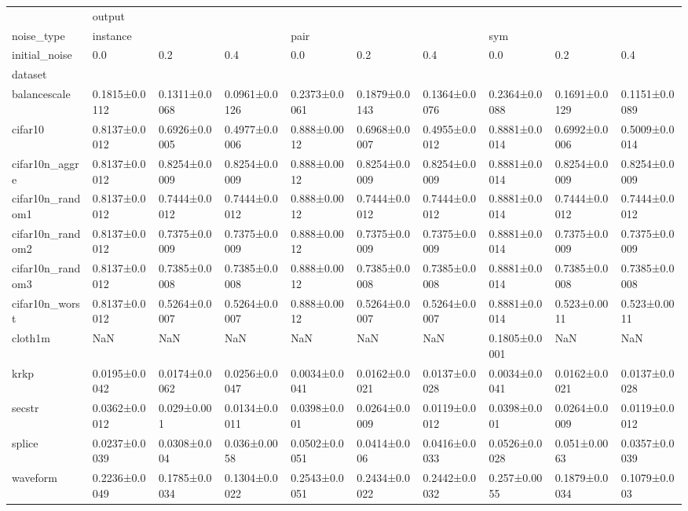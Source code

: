 \begin{tabular}{llllllllll}
\toprule
{} & \multicolumn{9}{l}{output} \\
noise\_type & \multicolumn{3}{l}{instance} & \multicolumn{3}{l}{pair} & \multicolumn{3}{l}{sym} \\
initial\_noise &            0.0 &            0.2 &            0.4 &            0.0 &            0.2 &            0.4 &            0.0 &            0.2 &            0.4 \\
dataset          &                &                &                &                &                &                &                &                &                \\
\midrule
balancescale     &  0.1815±0.0112 &  0.1311±0.0068 &  0.0961±0.0126 &  0.2373±0.0061 &  0.1879±0.0143 &  0.1364±0.0076 &  0.2364±0.0088 &  0.1691±0.0129 &  0.1151±0.0089 \\
cifar10          &  0.8137±0.0012 &  0.6926±0.0005 &  0.4977±0.0006 &   0.888±0.0012 &  0.6968±0.0007 &  0.4955±0.0012 &  0.8881±0.0014 &  0.6992±0.0006 &  0.5009±0.0014 \\
cifar10n\_aggre   &  0.8137±0.0012 &  0.8254±0.0009 &  0.8254±0.0009 &   0.888±0.0012 &  0.8254±0.0009 &  0.8254±0.0009 &  0.8881±0.0014 &  0.8254±0.0009 &  0.8254±0.0009 \\
cifar10n\_random1 &  0.8137±0.0012 &  0.7444±0.0012 &  0.7444±0.0012 &   0.888±0.0012 &  0.7444±0.0012 &  0.7444±0.0012 &  0.8881±0.0014 &  0.7444±0.0012 &  0.7444±0.0012 \\
cifar10n\_random2 &  0.8137±0.0012 &  0.7375±0.0009 &  0.7375±0.0009 &   0.888±0.0012 &  0.7375±0.0009 &  0.7375±0.0009 &  0.8881±0.0014 &  0.7375±0.0009 &  0.7375±0.0009 \\
cifar10n\_random3 &  0.8137±0.0012 &  0.7385±0.0008 &  0.7385±0.0008 &   0.888±0.0012 &  0.7385±0.0008 &  0.7385±0.0008 &  0.8881±0.0014 &  0.7385±0.0008 &  0.7385±0.0008 \\
cifar10n\_worst   &  0.8137±0.0012 &  0.5264±0.0007 &  0.5264±0.0007 &   0.888±0.0012 &  0.5264±0.0007 &  0.5264±0.0007 &  0.8881±0.0014 &   0.523±0.0011 &   0.523±0.0011 \\
cloth1m          &            NaN &            NaN &            NaN &            NaN &            NaN &            NaN &  0.1805±0.0001 &            NaN &            NaN \\
krkp             &  0.0195±0.0042 &  0.0174±0.0062 &  0.0256±0.0047 &  0.0034±0.0041 &  0.0162±0.0021 &  0.0137±0.0028 &  0.0034±0.0041 &  0.0162±0.0021 &  0.0137±0.0028 \\
secstr           &  0.0362±0.0012 &    0.029±0.001 &  0.0134±0.0011 &   0.0398±0.001 &  0.0264±0.0009 &  0.0119±0.0012 &   0.0398±0.001 &  0.0264±0.0009 &  0.0119±0.0012 \\
splice           &  0.0237±0.0039 &   0.0308±0.004 &   0.036±0.0058 &  0.0502±0.0051 &   0.0414±0.006 &  0.0416±0.0033 &  0.0526±0.0028 &   0.051±0.0063 &  0.0357±0.0039 \\
waveform         &  0.2236±0.0049 &  0.1785±0.0034 &  0.1304±0.0022 &  0.2543±0.0051 &  0.2434±0.0022 &  0.2442±0.0032 &   0.257±0.0055 &  0.1879±0.0034 &   0.1079±0.003 \\
\bottomrule
\end{tabular}
